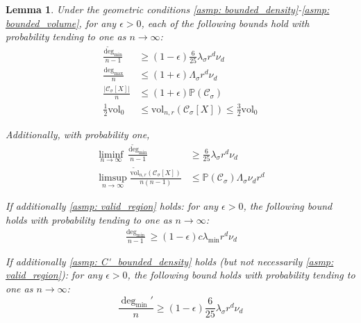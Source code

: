 \documentclass[11pt,twoside]{article}
\newtheorem{lemma}{Lemma}
\newcommand{\vol}{\mathrm{vol}}
\newcommand{\abs}[1]{\left \lvert #1 \right \rvert}
\newcommand{\1}{\mathbf{1}}
\newcommand{\Xbf}{X}             %
\newcommand{\Pbb}{\mathbb{P}}
\newcommand{\Cset}{\mathcal{C}}
\newcommand{\Csig}{\Cset_{\sigma}}
\newcommand{\degminpr}{\deg_{\min}'}
\newcommand{\degminwt}{\widetilde{\deg}_{\min}}
\newcommand{\degmax}{\deg_{\max}}
\newcommand{\degmin}{\deg_{\min}}
\begin{document}
\begin{lemma}
	\label{lem: ball_bounds_in_probability}
	Under the geometric conditions \ref{asmp: bounded_density}-\ref{asmp: bounded_volume}, for any $\epsilon > 0$, each of the following bounds hold with probability tending to one as $n \to \infty$:
	\begin{align}
	\frac{\degminwt}{n - 1} & \geq (1 - \epsilon)\frac{6}{25} \lambda_{\sigma} r^d \nu_d \label{eqn: min_cluster_degree_bound} \\
	\frac{\degmax}{n} & \leq (1 + \epsilon)\Lambda_{\sigma} r^d \nu_d \label{eqn: max_degree_bound}\\
	\frac{\abs{\Csig[\Xbf]}}{n} & \leq (1 + \epsilon)\Pbb(\Csig) \label{eqn: Csig_cardinality_bound}\\
	\label{eqn: volwt_bound}
	\frac{1}{2}\vol_0 &\leq \vol_{n,r}(\Csig[\Xbf])  \leq \frac{3}{2} \vol_0
	\end{align}
	
	Additionally, with probability one,
	\begin{align}
	\liminf_{n \to \infty} \frac{\degminwt}{n - 1} & \geq \frac{6}{25} \lambda_{\sigma} r^d \nu_d \label{eqn: min_cluster_degree_bound_asymp}\\
	\limsup_{n \to \infty} \frac{\widetilde{\vol}_{n,r}(\Csig[\Xbf])}{n(n-1)} & \leq \Pbb(\Csig) \Lambda_{\sigma} \nu_d r^d \label{eqn: max_vol_bound_asymp}
	\end{align}
	
	If additionally \ref{asmp: valid_region} holds: for any $\epsilon > 0$, the following bound holds with probability tending to one as $n \to \infty$:
	\begin{align}
	\frac{\degmin}{n - 1} \geq (1 - \epsilon)c\lambda_{\min} r^d \nu_d \label{eqn: min_degree_bound} 
	\end{align}
	
	If additionally \ref{asmp: C'_bounded_density} holds (but not necessarily \ref{asmp: valid_region}): for any $\epsilon > 0$, the following bound holds with probability tending to one as $n \to \infty$:
	\begin{equation}
	\label{eqn: min_cluster_degree_bound_2}
	\frac{\degminpr}{n} \geq (1 - \epsilon)\frac{6}{25} \lambda_{\sigma} r^d \nu_d
	\end{equation}
\end{lemma}
\end{document}
